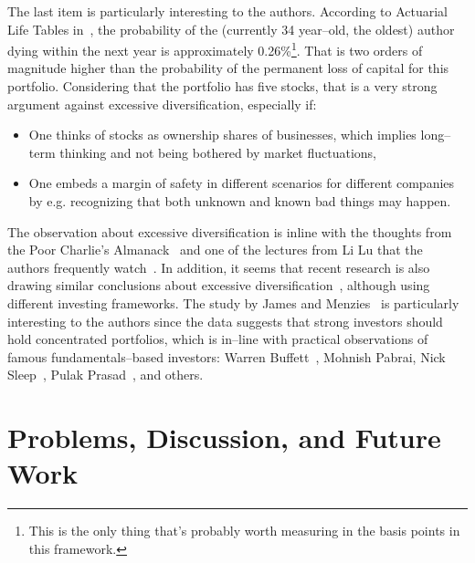 \documentclass{article}
\begin{document}
\noindent The last item is particularly interesting to the authors. According to
Actuarial Life Tables in~\cite{lifeTables}, the probability of the (currently 34
year--old, the oldest) author dying within the next year is approximately
0.26\%\footnote{This is the only thing that's probably worth measuring in the
basis points in this framework.}. That is two orders of magnitude higher than
the probability of the permanent loss of capital for this portfolio. Considering
that the portfolio has five stocks, that is a very strong argument against
excessive diversification, especially if:
\begin{itemize}
    \item One thinks of stocks as ownership shares of businesses, which implies
    long--term thinking and not being bothered by market fluctuations, 
    \item One embeds a margin of safety in different scenarios for different
    companies by e.g. recognizing that both unknown and known bad things may
    happen.
\end{itemize}

\noindent The observation about excessive diversification is inline with the
thoughts from the Poor Charlie's Almanack~\cite{almanack} and one of the
lectures from Li Lu that the authors frequently watch~\cite{liLuLecture}. In
addition, it seems that recent research is also drawing similar conclusions
about excessive diversification~\cite{jamesMenzies,arvanitisEtAl}, although
using different investing frameworks. The study by James and
Menzies~\cite{jamesMenzies} is particularly interesting to the authors since the
data suggests that strong investors should hold concentrated portfolios, which
is in--line with practical observations of famous fundamentals--based investors:
Warren Buffett~\cite{berkshireLetters}, Mohnish Pabrai, Nick
Sleep~\cite{nomadLetters}, Pulak Prasad~\cite{darwinInvesting}, and others.

\section{Problems, Discussion, and Future Work}
\label{sec:futureWork}
\end{document}
